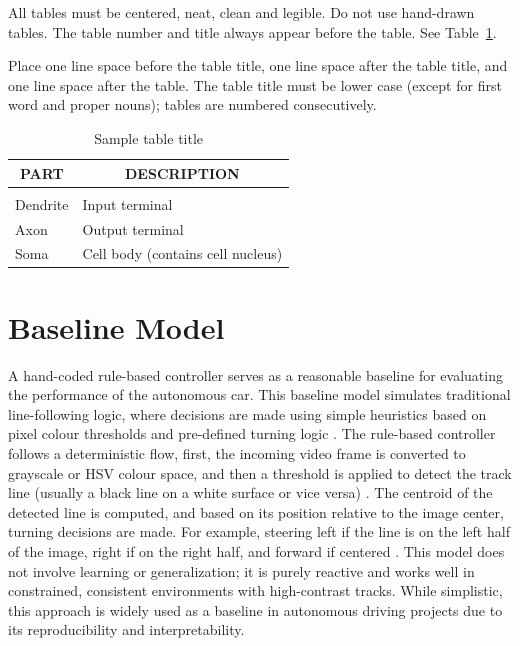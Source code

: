\documentclass{article} %
\begin{document}
All tables must be centered, neat, clean and legible. Do not use hand-drawn
tables. The table number and title always appear before the table. See
Table~\ref{sample-table}.

Place one line space before the table title, one line space after the table
title, and one line space after the table. The table title must be lower case
(except for first word and proper nouns); tables are numbered consecutively.

\begin{table}[t]
\caption{Sample table title}
\label{sample-table}
\begin{center}
\begin{tabular}{ll}
\multicolumn{1}{c}{\bf PART}  &\multicolumn{1}{c}{\bf DESCRIPTION}
\\ \hline \\
Dendrite         &Input terminal \\
Axon             &Output terminal \\
Soma             &Cell body (contains cell nucleus) \\
\end{tabular}
\end{center}
\end{table}



\section{Baseline Model}

A hand-coded rule-based controller serves as a reasonable baseline for evaluating the performance of the autonomous car. 
This baseline model simulates traditional line-following logic, where decisions are made using simple heuristics based on 
pixel colour thresholds and pre-defined turning logic \citep{LIKMETA2020103568}. The rule-based controller follows a deterministic flow, first, the incoming 
video frame is converted to grayscale or HSV colour space, and then a threshold is applied to detect the track line (usually a black line 
on a white surface or vice versa) \citep{LIKMETA2020103568}. The centroid of the detected line is computed, and based on its position relative to the image center, 
turning decisions are made. For example, steering left if the line is on the left half of the image, right if on the right half, and forward if 
centered \citep{bojarski2016endendlearningselfdriving}. This model does not involve learning or generalization; it is purely reactive and works well in constrained, consistent environments 
with high-contrast tracks. While simplistic, this approach is widely used as a baseline in autonomous driving projects due to its reproducibility 
and interpretability.
\end{document}
